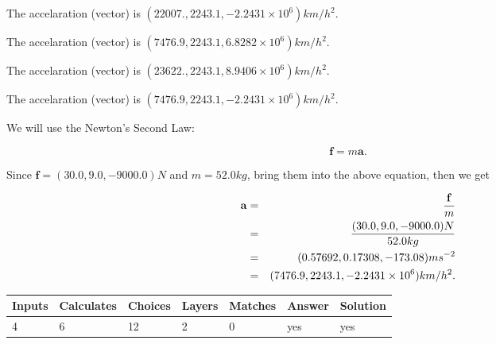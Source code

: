 \documentclass[12pt]{article}
\begin{document}
 
The accelaration (vector) is
$(
22007.,
2243.1 ,
-2.2431 \times 10^{6}
)km/h^2.
$
 
 
The accelaration (vector) is
$(
7476.9,
2243.1 ,
6.8282 \times 10^{6}
)km/h^2.
$
 
 
The accelaration (vector) is
$(
23622.,
2243.1 ,
8.9406 \times 10^{6}
)km/h^2.
$
 
 
\noindent{}
 
 
The accelaration (vector) is
$(
7476.9,
2243.1 ,
-2.2431 \times 10^{6}
)km/h^2.
$
 
 
\noindent{}
 
 
 
 
 
 
\noindent{}
 
 

We will use the Newton's Second Law:
 
\[
\mathbf{f}=m\mathbf{a}.
\]
 
Since $\mathbf{f}=( %
30.0,  %
9.0,  %
-9000.0 )N$
and $m= %
52.0 kg$, bring them into the above equation, then we get
 
\begin{eqnarray*}
\mathbf{a}&=&\frac{\mathbf{f}}m  \\
&=&\frac{(
30.0 ,
9.0 ,
-9000.0 )N
}{ %
52.0 kg}  \\
&=&(
0.57692 ,
0.17308,
-173.08
)ms^{-2} \\
&=&(
7476.9 ,
2243.1 ,
-2.2431 \times 10^{6}
)km/h^2.
\end{eqnarray*}
 
 
 
\noindent{}
 
 

 
 
\vspace{0.3in}
   
   
   
   
\noindent\begin{tabular}{|l|l|l|l|l|l|l|}
 \hline
Inputs & Calculates & Choices & Layers & Matches & Answer & Solution \\ \hline
           4  & 
           6  & 
          12
  & 
           2  & 
           0  & 
  yes & 
  yes 
  \\ \hline
 \end{tabular}
   
\end{document}
